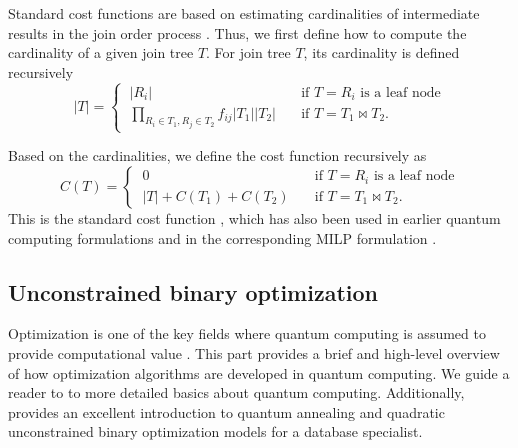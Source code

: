 Standard cost functions are based on estimating cardinalities of intermediate results in the join order process \cite{10.14778/2850583.2850594, Neumann_course, cluet1995complexity}. Thus, we first define how to compute the cardinality of a given join tree $T$. For join tree $T$, its cardinality is defined recursively
\begin{equation}\label{eq:join_tree_card}
    |T| = \begin{cases}
    \ |R_i| &\quad \text{if } T = R_i \text{ is a leaf node} \\
    \ \prod_{R_i \in T_1, R_j \in T_2} f_{ij}|T_1||T_2| &\quad \text{if } T = T_1 \bowtie T_2.
    \end{cases}
\end{equation}

Based on the cardinalities, we define the cost function recursively as
\begin{equation}\label{eq:cost_function}
    C(T) = \begin{cases}
        \ 0 &\quad \text{if } T = R_i \text{ is a leaf node} \\
        \ |T| + C(T_1) + C(T_2) &\quad \text{if } T = T_1 \bowtie T_2.
    \end{cases}
\end{equation}
This is the standard cost function \cite{cluet1995complexity}, which has also been used in earlier quantum computing formulations \cite{Schonberger_Scherzinger_Mauerer, 10.14778/3632093.3632112, Schonberger_Trummer_Mauerer_2023} and in the corresponding MILP formulation \cite{Trummer_Koch_2017}.

\subsection{Unconstrained binary optimization}

Optimization is one of the key fields where quantum computing is assumed to provide computational value \cite{abbas2024quantumoptimizationpotentialchallenges}. This part provides a brief and high-level overview of how optimization algorithms are developed in quantum computing. We guide a reader to \cite{Nielsen_Chuang_2010, Winker_Groppe_Uotila_Yan_Lu_Franz_Mauerer_2023} to more detailed basics about quantum computing. Additionally, \cite{Schonberger_Scherzinger_Mauerer} provides an excellent introduction to quantum annealing and quadratic unconstrained binary optimization models for a database specialist.

